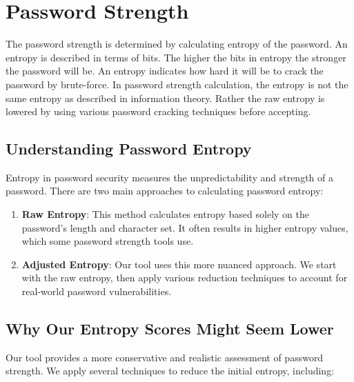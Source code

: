 \chapter{Password Strength}

The password strength is determined by calculating entropy of the 
password. An entropy is described in terms of bits. The higher the bits in entropy
the stronger the password will be. An entropy indicates how hard it will be to 
crack the password by brute-force. In password strength calculation, the entropy 
is not the same entropy as described in information theory. Rather the raw entropy 
is lowered by using various password cracking techniques before accepting.

\section{Understanding Password Entropy}
Entropy in password security measures the unpredictability and strength of a password. There are two main approaches to calculating password entropy:
\begin{enumerate}
    \item \textbf{Raw Entropy}: This method calculates entropy based solely on the password's length and character set. It often results in higher entropy values, which some password strength tools use.
    
    \item \textbf{Adjusted Entropy}: Our tool uses this more nuanced approach. We start with the raw entropy, then apply various reduction techniques to account for real-world password vulnerabilities.
\end{enumerate}

\section{Why Our Entropy Scores Might Seem Lower}

Our tool provides a more conservative and realistic assessment of password strength. We apply several techniques to reduce the initial entropy, including:

